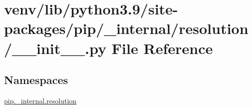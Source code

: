 \hypertarget{venv_2lib_2python3_89_2site-packages_2pip_2__internal_2resolution_2____init_____8py}{}\section{venv/lib/python3.9/site-\/packages/pip/\+\_\+internal/resolution/\+\_\+\+\_\+init\+\_\+\+\_\+.py File Reference}
\label{venv_2lib_2python3_89_2site-packages_2pip_2__internal_2resolution_2____init_____8py}
\subsection*{Namespaces}
\begin{DoxyCompactItemize}
\item 
 \hyperlink{namespacepip_1_1__internal_1_1resolution}{pip.\+\_\+internal.\+resolution}
\end{DoxyCompactItemize}
